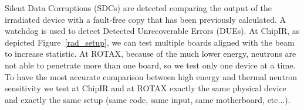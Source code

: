 %

Silent Data Corruptions (SDCs) are detected comparing the output of the irradiated device with a fault-free copy that has been previously calculated. A watchdog is used to detect Detected Unrecoverable Errors (DUEs). At ChipIR, as depicted Figure~\ref{rad_setup}, we can test multiple boards aligned with the beam to increase statistic. At ROTAX, because of the much lower energy, neutrons are not able to penetrate more than one board, so we test only one device at a time. To have the most accurate comparison between high energy and thermal neutron sensitivity we test at ChipIR and at ROTAX exactly the same physical device and exactly the same setup (same code, same input, same motherboard, etc...).

